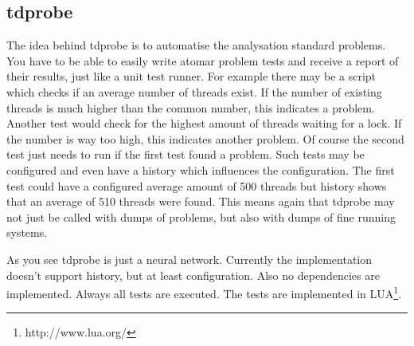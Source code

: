 \subsection{tdprobe}

The idea behind tdprobe is to automatise the analysation standard problems.
You have to be able to easily write atomar problem tests and receive a report of their results, just like a unit test runner.
For example there may be a script which checks if an average number of threads exist.
If the number of existing threads is much higher than the common number, this indicates a problem.
Another test would check for the highest amount of threads waiting for a lock.
If the number is way too high, this indicates another problem.
Of course the second test just needs to run if the first test found a problem.
Such tests may be configured and even have a history which influences the configuration.
The first test could have a configured average amount of 500 threads but history shows that an average of 510 threads were found.
This means again that tdprobe may not just be called with dumps of problems, but also with dumps of fine running systems.

As you see tdprobe is just a neural network.
Currently the implementation doesn't support history, but at least configuration.
Also no dependencies are implemented.
Always all tests are executed.
The tests are implemented in LUA\footnote{http://www.lua.org/}.
